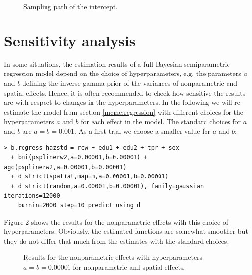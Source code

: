 \begin{figure}[ht]
\begin{center}
{\it\caption{Sampling path of the intercept.\label{mcmc:sample1}}}
\end{center}
\end{figure}

\section{Sensitivity analysis}\label{mcmc:sensitivity}

In some situations, the estimation results of a full Bayesian semiparametric regression model depend on the choice of
hyperparameters, e.g. the parameters $a$ and $b$ defining the inverse gamma prior of the variances of nonparametric and spatial
effects. Hence, it is often recommended to check how sensitive the results are with respect to changes in the hyperparameters.
In the following we will re-estimate the model from section \ref{mcmc:regression} with different choices for the
hyperparameters $a$ and $b$ for each effect in the model. The standard choices for $a$ and $b$ are $a=b=0.001$. As a first
trial we choose a smaller value for $a$ and $b$:

\begin{verbatim}
> b.regress hazstd = rcw + edu1 + edu2 + tpr + sex
  + bmi(psplinerw2,a=0.00001,b=0.00001) + agc(psplinerw2,a=0.00001,b=0.00001)
  + district(spatial,map=m,a=0.00001,b=0.00001)
  + district(random,a=0.00001,b=0.00001), family=gaussian iterations=12000
    burnin=2000 step=10 predict using d
\end{verbatim}

Figure \ref{mcmc:sensi1} shows the results for the nonparametric effects with this choice of hyperparameters. Obviously, the
estimated functions are somewhat smoother but they do not differ that much from the estimates with the standard choices.

\begin{figure}[ht]
\begin{center}
 {\it\caption{Results for
the nonparametric effects with hyperparameters $a=b=0.00001$ for
nonparametric and spatial effects.\label{mcmc:sensi1}}}
\end{center}
\end{figure}


